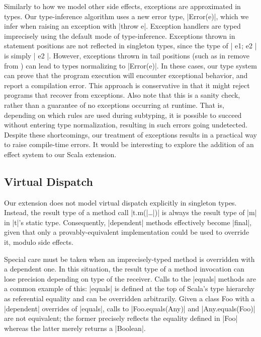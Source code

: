 Similarly to how we model other side effects, exceptions are approximated in types.
Our type-inference algorithm uses a new error type, |Error(e)|, which we infer when raising an exception with |throw e|.
Exception handlers are typed imprecisely using the default mode of type-inference.
Exceptions thrown in statement positions are not reflected in singleton types, since the type of |{ e1; e2 }| is simply |{ e2 }|.
However, exceptions thrown in tail positions (such as in remove from ) can lead to types normalizing to |Error(e)|.
In these cases, our type system can prove that the program execution will encounter exceptional behavior, and report a compilation error.
This approach is conservative in that it might reject programs that recover from exceptions.
Also note that this is a sanity check, rather than a guarantee of no exceptions occurring at runtime.
That is, depending on which rules are used during subtyping, it is possible to succeed without entering type normalization, resulting in such errors going undetected.
Despite these shortcomings, our treatment of exceptions results in a practical way to raise compile-time errors.
It would be interesting to explore the addition of an effect system to our Scala extension.

\subsection{Virtual Dispatch}

Our extension does not model virtual dispatch explicitly in singleton types.
Instead, the result type of a method call |t.m(|\ldots{}|)| is always the result type of |m| in |t|'s static type.
Consequently, |dependent| methods effectively become |final|, given that only a provably-equivalent implementation could be used to override it, modulo side effects.

Special care must be taken when an imprecisely-typed method is overridden with a dependent one.
In this situation, the result type of a method invocation can lose precision depending on type of the receiver.
Calls to the |equals| methods are a common example of this: |equals| is defined at the top of Scala's type hierarchy as referential equality and can be overridden arbitrarily.
Given a class Foo with a |dependent| overrides of |equals|, calls to |Foo.equals(Any)| and |Any.equals(Foo)| are not equivalent; the former precisely reflects the equality defined in |Foo| whereas the latter merely returns a |Boolean|.


